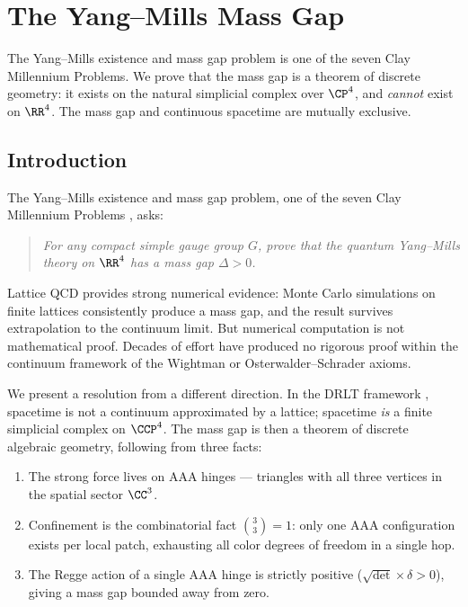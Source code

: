 \section{The Yang--Mills Mass Gap}
\label{ch:yang_mills}

The Yang--Mills existence and mass gap problem is one of the seven Clay Millennium Problems. We prove that the mass gap is a theorem of discrete geometry: it exists on the natural simplicial complex over $\CP^4$, and \emph{cannot} exist on $\RR^4$. The mass gap and continuous spacetime are mutually exclusive.

\subsection{Introduction}
\label{sec:intro}

The Yang--Mills existence and mass gap problem, one of the seven Clay
Millennium Problems \cite{Clay}, asks:

\begin{quote}
\emph{For any compact simple gauge group $G$, prove that the quantum
Yang--Mills theory on $\RR^4$ has a mass gap $\Delta > 0$.}
\end{quote}

\noindent
Lattice QCD \cite{Wilson, Creutz} provides strong numerical evidence:
Monte Carlo simulations on finite lattices consistently produce a mass
gap, and the result survives extrapolation to the continuum limit. But
numerical computation is not mathematical proof. Decades of effort have
produced no rigorous proof within the continuum framework of the Wightman
\cite{Wightman} or Osterwalder--Schrader \cite{OS} axioms.

We present a resolution from a different direction. In the DRLT framework
, spacetime is not a continuum approximated by a
lattice; spacetime \emph{is} a finite simplicial complex on
$\CCP^4$. The mass gap is then a theorem of discrete algebraic
geometry, following from three facts:

\begin{enumerate}
\item The strong force lives on AAA hinges --- triangles with all three
  vertices in the spatial sector $\CC^3$.
\item Confinement is the combinatorial fact $\binom{3}{3} = 1$: only one
  AAA configuration exists per local patch, exhausting all color degrees
  of freedom in a single hop.
\item The Regge action of a single AAA hinge is strictly positive
  ($\sqrt{\det} \times \delta > 0$), giving a mass gap bounded away
  from zero.
\end{enumerate}

